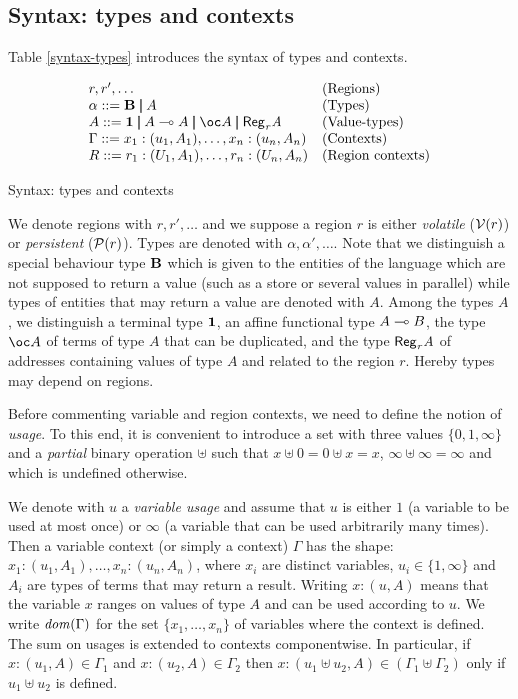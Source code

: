 \documentclass[11pt]{article}
\newcommand{\hyp}[3]{#1:(#2, #3)}
\newcommand{\behtype}{{\bf B}}
\newcommand{\csum}{\uplus}              \newcommand{\dpar}{\mid\!\mid}
\newcommand{\set}[1]{\{#1\}}
\newcommand{\rgtype}[2]{{\it {\sf Reg}_{#1} #2}}
\newcommand{\vlt}[1]{{\cal V}(#1)}
\newcommand{\prs}[1]{{\cal P}(#1)}
\begin{document}
\subsection{Syntax: types and contexts}
Table \ref{syntax-types} introduces the syntax of types and contexts.
\begin{table}
{\footnotesize
\[
\begin{array}{ll}

r,r',\ldots                                           &\mbox{(Regions)} \\
\alpha::= \behtype \Alt A                             &\mbox{(Types)} \\
A::= \tertype \Alt A\limp A \Alt \bang A \Alt \rgtype{r}{A}   &\mbox{(Value-types)} \\
\Gamma::= \hyp{x_{1}}{u_{1}}{A_{1}},\ldots,\hyp{x_{n}}{u_{n}}{A_{n}}  &\mbox{(Contexts)} \\
R::= \hyp{r_{1}}{U_{1}}{A_{1}},\ldots,\hyp{r_{n}}{U_{n}}{A_{n}}  &\mbox{(Region contexts)} \\

\end{array}
\]}
\caption{Syntax: types and contexts}\label{syntax-types}
\end{table}
We denote regions with $r,r',\ldots$ and we suppose a region $r$
is either {\em volatile} ($\vlt{r}$) or {\em persistent} ($\prs{r}$).
Types are denoted with $\alpha,\alpha',\ldots$. Note that we distinguish a
special behaviour type $\behtype$ which is given to the entities of
the language which are
not supposed to return a value  (such as a store or several values in parallel)
while types of entities that may return a value are denoted with $A$.
Among the types $A$, we distinguish a terminal type ${\bf 1}$, 
an affine functional type $A \multimap B$, the type $\bang A$ of terms of type $A$
that can be duplicated, and the type $\rgtype{r}{A}$ of 
addresses containing values of type $A$
and related to the region $r$. Hereby types may depend on regions.

Before commenting variable and region contexts, we need to define the notion of {\em usage}.
To this end, it is convenient to introduce a set with three values 
$\set{0,1,\infty}$ and a {\em partial} binary operation $\csum$ such
that $x\csum 0 = 0\csum x = x$, $\infty \csum \infty = \infty$ and which
is undefined otherwise.

We denote with $u$ a {\em variable usage} and assume that $u$ is either $1$ (a variable to be used
at most once) or $\infty$ (a variable that can be used arbitrarily many times).
Then a variable context (or simply a context) $\Gamma$ has the  shape:
$\hyp{x_{1}}{u_{1}}{A_{1}},\ldots,\hyp{x_{n}}{u_{n}}{A_{n}}$,
where $x_i$ are distinct variables, $u_i\in \set{1,\infty}$ and $A_i$ are types of
terms that may return a result. Writing $\hyp{x}{u}{A}$ means that the variable 
$x$ ranges on values of type $A$ and can be used according to $u$.
We  write ${\it dom}(\Gamma)$ for the set $\set{x_1,\ldots,x_n}$ of
variables where the context is defined.
The sum on usages is extended to contexts componentwise.
In particular, if  $x:(u_1,A)\in \Gamma_1$ and $x:(u_2,A)\in \Gamma_2$ then
$x:(u_1\csum u_2,A)\in (\Gamma_1\csum \Gamma_2)$ only if 
$u_1\csum u_2$ is defined.
\end{document}

